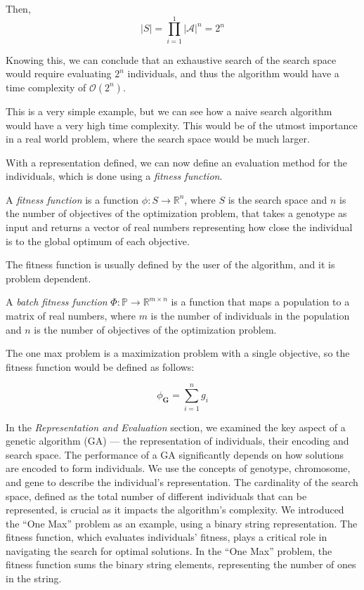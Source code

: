   Then,
  \[
    |S| = \prod_{i=1}^1 |\mathcal{A}|^n = 2^n
  \]

  Knowing this, we can conclude that an exhaustive search of the search space would require 
  evaluating \(2^n\) individuals, and thus the algorithm would have a time complexity of 
  \(\mathcal{O}(2^n)\).
  
  This is a very simple example, but we can see how a naive search algorithm would have a very
  high time complexity.
  This would be of the utmost importance in a real world problem, where the search space would be
  much larger.

  With a representation defined, we can now define an evaluation method for the individuals, which
  is done using a \emph{fitness function}.

  \begin{definition}
  \label{def:fitness_function}
    A \emph{fitness function} is a function \(\phi: S \rightarrow \mathbb{R}^n\), where \(S\) is the
    search space and \(n\) is the number of objectives of the optimization problem, that takes a
    genotype as input and returns a vector of real numbers representing how close the individual 
    is to the global optimum of each objective.

    The fitness function is usually defined by the user of the algorithm, and it is problem
    dependent.
  \end{definition}

  \begin{definition}
  \label{def:batch_fitness_function}
    A \emph{batch fitness function} \(\Phi: \mathbb{P} \rightarrow \mathbb{R}^{m \times n}\) is a 
    function that maps a population to a matrix of real numbers, where \(m\) is the number of
    individuals in the population and \(n\) is the number of objectives of the optimization
    problem.
  \end{definition}

  The one max problem is a maximization problem with a single objective, so the
  fitness function would be defined as follows:

  \begin{equation}
    \label{eq:fitness_function:one_max}
    \phi_\mathbf{G} = \sum_{i=1}^n g_i
  \end{equation}

  In the \emph{Representation and Evaluation} section, we examined the key aspect of a genetic 
  algorithm (GA) — the representation of individuals, their encoding and search space.
  The performance of a GA significantly depends on how solutions are encoded to form individuals.
  We use the concepts of genotype, chromosome, and gene to describe the individual's representation.
  The cardinality of the search space, defined as the total number of different individuals that can
  be represented, is crucial as it impacts the algorithm's complexity.
  We introduced the \enquote{One Max} problem as an example, using a binary string representation.
  The fitness function, which evaluates individuals' fitness, plays a critical role in navigating 
  the search for optimal solutions.
  In the \enquote{One Max} problem, the fitness function sums the binary string elements, 
  representing the number of ones in the string.
